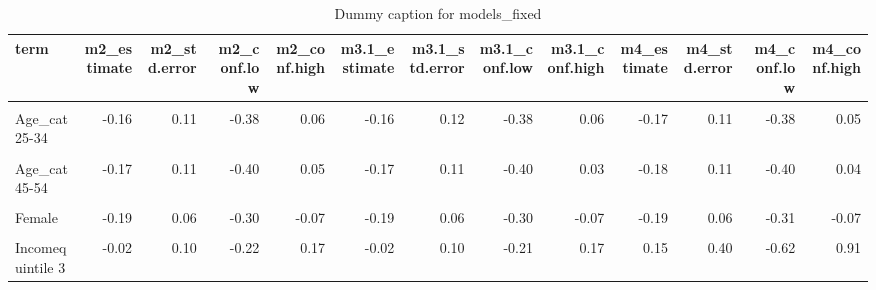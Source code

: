 \begin{table}
\centering
\caption{Dummy caption for models_fixed}
\centering
\fontsize{10}{12}\selectfont
\begin{tabular}[t]{lrrrrrrrrrrrr}
\toprule
term & m2\_estimate & m2\_std.error & m2\_conf.low & m2\_conf.high & m3.1\_estimate & m3.1\_std.error & m3.1\_conf.low & m3.1\_conf.high & m4\_estimate & m4\_std.error & m4\_conf.low & m4\_conf.high\\
\midrule
\cellcolor{gray!10}{(Intercept)} & \cellcolor{gray!10}{-2.12} & \cellcolor{gray!10}{0.52} & \cellcolor{gray!10}{-3.20} & \cellcolor{gray!10}{-0.99} & \cellcolor{gray!10}{-2.20} & \cellcolor{gray!10}{0.33} & \cellcolor{gray!10}{-2.91} & \cellcolor{gray!10}{-1.46} & \cellcolor{gray!10}{-2.46} & \cellcolor{gray!10}{0.44} & \cellcolor{gray!10}{-3.38} & \cellcolor{gray!10}{-1.59}\\
Age\_cat25-34 & -0.16 & 0.11 & -0.38 & 0.06 & -0.16 & 0.12 & -0.38 & 0.06 & -0.17 & 0.11 & -0.38 & 0.05\\
\cellcolor{gray!10}{Age\_cat35-44} & \cellcolor{gray!10}{-0.23} & \cellcolor{gray!10}{0.12} & \cellcolor{gray!10}{-0.46} & \cellcolor{gray!10}{-0.01} & \cellcolor{gray!10}{-0.23} & \cellcolor{gray!10}{0.11} & \cellcolor{gray!10}{-0.46} & \cellcolor{gray!10}{-0.02} & \cellcolor{gray!10}{-0.25} & \cellcolor{gray!10}{0.11} & \cellcolor{gray!10}{-0.47} & \cellcolor{gray!10}{-0.03}\\
Age\_cat45-54 & -0.17 & 0.11 & -0.40 & 0.05 & -0.17 & 0.11 & -0.40 & 0.03 & -0.18 & 0.11 & -0.40 & 0.04\\
\cellcolor{gray!10}{Age\_cat55+} & \cellcolor{gray!10}{0.17} & \cellcolor{gray!10}{0.10} & \cellcolor{gray!10}{-0.01} & \cellcolor{gray!10}{0.36} & \cellcolor{gray!10}{0.18} & \cellcolor{gray!10}{0.10} & \cellcolor{gray!10}{-0.01} & \cellcolor{gray!10}{0.35} & \cellcolor{gray!10}{0.18} & \cellcolor{gray!10}{0.09} & \cellcolor{gray!10}{0.00} & \cellcolor{gray!10}{0.36}\\
Female & -0.19 & 0.06 & -0.30 & -0.07 & -0.19 & 0.06 & -0.30 & -0.07 & -0.19 & 0.06 & -0.31 & -0.07\\
\cellcolor{gray!10}{Incomequintile 2} & \cellcolor{gray!10}{-0.03} & \cellcolor{gray!10}{0.10} & \cellcolor{gray!10}{-0.23} & \cellcolor{gray!10}{0.17} & \cellcolor{gray!10}{-0.03} & \cellcolor{gray!10}{0.10} & \cellcolor{gray!10}{-0.22} & \cellcolor{gray!10}{0.16} & \cellcolor{gray!10}{0.33} & \cellcolor{gray!10}{0.41} & \cellcolor{gray!10}{-0.47} & \cellcolor{gray!10}{1.14}\\
Incomequintile 3 & -0.02 & 0.10 & -0.22 & 0.17 & -0.02 & 0.10 & -0.21 & 0.17 & 0.15 & 0.40 & -0.62 & 0.91\\

\end{tabular}
\end{table}
